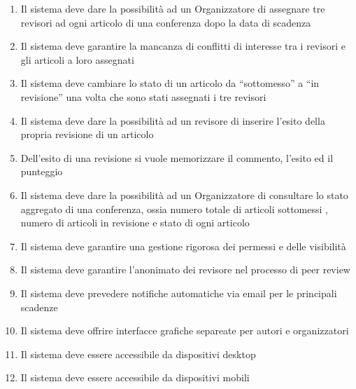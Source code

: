 \begin{enumerate}
\item Il sistema deve dare la possibilità ad un Organizzatore di assegnare tre revisori ad ogni articolo di una conferenza dopo la data di scadenza
\item Il sistema deve garantire la mancanza di conflitti di interesse tra i revisori e gli articoli a loro assegnati
\item Il sistema deve cambiare lo stato di un articolo da ``sottomesso'' a ``in revisione'' una volta che sono stati assegnati i tre revisori
\item Il sistema deve dare la possibilità ad un revisore di inserire l'esito della propria revisione di un articolo
\item Dell'esito di una revisione si vuole memorizzare il commento, l'esito ed il punteggio
\item Il sistema deve dare la possibilità ad un Organizzatore di consultare lo stato aggregato di una conferenza, ossia numero totale di articoli sottomessi
  , numero di articoli in revisione e stato di ogni articolo
\item Il sistema deve garantire una gestione rigorosa dei permessi e delle visibilità
\item Il sistema deve garantire l'anonimato dei revisore nel processo di peer review
\item Il sistema deve prevedere notifiche automatiche via email per le principali scadenze
\item Il sistema deve offrire interfacce grafiche separeate per autori e organizzatori
\item Il sistema deve essere accessibile da dispositivi desktop
\item Il sistema deve essere accessibile da dispositivi mobili
\end{enumerate}

